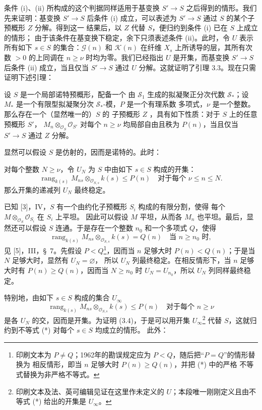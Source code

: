 条件 (i)、(ii) 所构成的这个判据同样适用于基变换
$S'\longrightarrow S$ 之后得到的情形。我们先来证明：基变换
$S'\longrightarrow S$ 后条件 (i) 成立，可以表述为
$S'\longrightarrow S$ 通过 $S$ 的某个子预概形 $Z$ 分解。得到这一
结果后，以 $Z$ 代替 $S$，便归约到条件 (i) 已在 $S$ 上成立的情形；
由于该条件在基变换下稳定，余下只须表述条件 (ii)。此时，令 $U$
表示所有如下 $s\in S$ 的集合：$\mathcal G(n)$ 和 $\mathcal K(n)$
在纤维 $X_s$ 上所诱导的层，其所有次数 $>0$ 的上同调在
$n\geq\nu$ 时均为零。我们已经指出 $U$ 是开集，而基变换
$S'\longrightarrow S$ 后条件 (ii) 成立，当且仅当
$S'\longrightarrow S$ 通过 $U$ 分解。这就证明了引理 3.3。现在只需
证明下述引理：

 设 $S$ 是一个局部诺特预概形，配备一个
由 $\mathcal S_1$ 生成的拟凝聚正分次代数 $\mathcal S_*$；设 $M_*$
是一个有限型拟凝聚分次 $\mathcal S_*$-模，$P$ 是一个有理系数
多项式，$\nu$ 是一个整数。那么存在一个（显然唯一的）$S$ 的
子预概形 $Z$
，具有如下性质：对于 $S$ 上的任意预概形 $S'$，
$M_n\otimes_{\mathcal O_S}\mathcal O_{S'}$ 对每个 $n\geq\nu$
均局部自由且秩为 $P(n)$，当且仅当 $S'\longrightarrow S$ 通过 $Z$
分解。

显然可以假设 $S$ 是仿射的，因而是诺特的。此时：

 对每个整数 $N\geq\nu$，令 $U_N$ 为 $S$ 中由如下
$s\in S$ 构成的开集：
\[
\operatorname{rang}_{k(s)}
M_{ns}\otimes_{\mathcal O_{S,s}}k(s)\leq P(n)
\quad\text{对于每个 $\nu\leq n\leq N$}.
\]
那么开集的递减列 $U_N$ 最终稳定。

已知 [3]，IV，$S$ 有一个由约化子预概形 $S_i$ 构成的有限分割，使得
每个 $M\otimes_{\mathcal O_S}\mathcal O_{S_i}$ 在 $S_i$ 上平坦。
因此可以假设 $M$ 平坦，从而各 $M_n$ 也平坦。最后，显然还可以假设
$S$ 连通。于是存在一个整数 $n_0$ 和一个多项式 $Q$，使得
\[
\operatorname{rang}_{k(s)}
M_{ns}\otimes_{\mathcal O_{S,s}}k(s)=Q(n)
\quad\text{当 $n\geq n_0$ 时},
\]
见 [5]，III，\S~7。先假设 $P<Q$\footnote{印刷文本为
$P\neq Q$；1962年的勘误规定应为 $P<Q$，随后把“$P=Q$”的情形替换为
相反情形，即当 $n$ 足够大时 $P(n)\geq Q(n)$，并把 (*) 中的严格
不等式替换为非严格不等式。}，因而当 $n$ 足够大时
$P(n)<Q(n)$；于是当 $N$ 足够大时，显然有 $U_N=\varnothing$，
所以 $U_N$ 列最终稳定。在相反情形下，当 $n$ 足够大时有
$P(n)\geq Q(n)$，因而当 $N\geq n_0$ 时 $U_N=U_{n_0}$，所以
$U_N$ 列同样最终稳定。

特别地，由如下 $s\in S$ 构成的集合 $U_\infty$
\[
\tag{*}
\operatorname{rang}_{k(s)}
M_{ns}\otimes_{\mathcal O_{S,s}}k(s)\leq P(n)
\quad\text{对于每个 $n\geq\nu$}
\]
是各 $U_N$ 的交，因而是开集。为证明 (3.4)，于是可以用开集
$U_\infty$\footnote{印刷文本及法、英可编辑见证在这里作未定义的
$U$；本段唯一刚刚定义且由不等式 (*) 给出的开集是 $U_\infty$。}
代替 $S$，这就归约到不等式 (*) 对每个 $s\in S$ 均成立的情形。
此外：

